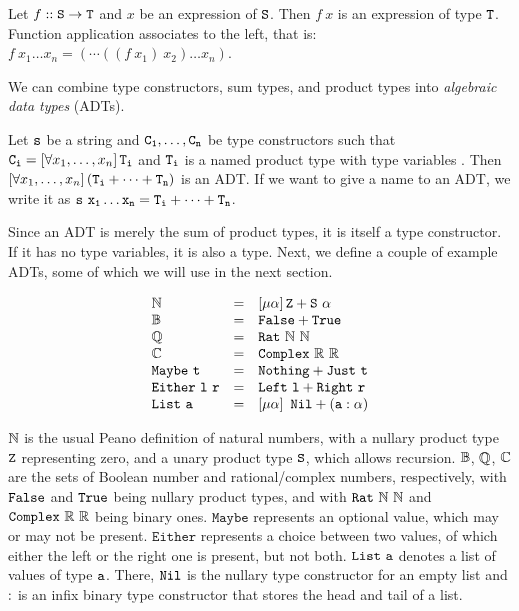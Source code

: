 \begin{definition}
	Let $f :: \mathtt{S} \rightarrow \mathtt{T}$ and $x$ be an expression of $\mathtt{S}$. Then $f\ x$ is an expression of type $\mathtt{T}$. Function application associates to the left, that is: $f\ x_1 \dots x_n = (\cdots((f\ x_1)\ x_2) \dots x_n)$.
\end{definition}

\noindent
We can combine type constructors, sum types, and product types into {\em algebraic data types} (ADTs).

\begin{definition}\label{def:ADT}
Let $\mathtt{s}$ be a string and $\mathtt{C_1},\dots,\mathtt{C_n}$ be type constructors such that $\mathtt{C_i} = \left[\forall x_1,\dots,x_n \right] \mathtt{T_i}$ and $\mathtt{T_i}$ is a named product type with type variables . Then $\left[\forall x_1,\dots,x_n \right] (\mathtt{T_i} + \dots + \mathtt{T_n})$ is an ADT. If we want to give a name to an ADT, we write it as $\mathtt{s\ x_1 \dots x_n = T_i + \dots + T_n}$.
\end{definition}

Since an ADT is merely the sum of product types, it is itself a type constructor. If it has no type variables, it is also a type. Next, we define a couple of example ADTs, some of which we will use in the next section.

\begin{example}
	$$
		\begin{array}{l c l}
			\N & = & \muQ{\alpha}\type{Z + S\ \alpha}\\ 
			\B & = & \type{False + True}\\
			\Q & = & \type{Rat}\ \N\ \N\\
			\C & = & \type{Complex}\ \R\ \R\\
			\type{Maybe\ t} & = & \type{Nothing + Just\ t}\\
			\type{Either\ l\ r} & = & \type{Left\ l + Right\ r}\\
			\type{List\ a} & = & \muQ{\alpha}\ \type{Nil + (a : \alpha)}\\
		\end{array}
	$$
	
	$\mathbb{N}$ is the usual Peano definition of natural numbers, with a nullary product type $\mathtt{Z}$ representing zero, and a unary product type $\mathtt{S}$, which allows recursion. $\mathbb{B}$, $\mathbb{Q}$, $\mathbb{C}$ are the sets of Boolean number and rational/complex numbers, respectively, with $\mathtt{False}$ and $\mathtt{True}$ being nullary product types, and with $\mathtt{Rat}\ \mathbb{N}\ \mathbb{N}$ and $\mathtt{Complex}\ \mathbb{R}\ \mathbb{R}$ being binary ones. $\mathtt{Maybe}$ represents an optional value, which may or may not be present. $\mathtt{Either}$ represents a choice between two values, of which either the left or the right one is present, but not both. $\mathtt{List\ a}$  denotes a list of values of type $\mathtt{a}$. There, $\mathtt{Nil}$ is the nullary type constructor for an empty list and $\mathtt{:}$ is an infix binary type constructor that stores the head and tail of a list.
\end{example}

